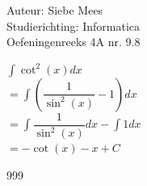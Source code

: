 \documentclass[a4paper]{article}
\begin{document}
  
\noindent \large Auteur: Siebe Mees \\
\noindent \large Studierichting: Informatica\\
\noindent \large Oefeningenreeks 4A nr. 9.8\\

\medskip

\normalsize

$ \displaystyle\int \cot^2(x)dx $\\

$ = \displaystyle\int \left(\dfrac{1}{\sin^2(x)} - 1\right)dx $\\

$ = \displaystyle\int \dfrac{1}{\sin^2(x)}dx - \displaystyle\int 1dx $\\

$ = -\cot(x) - x + C $\\

\begin{thebibliography}{999}
\end{thebibliography}
\end{document}
